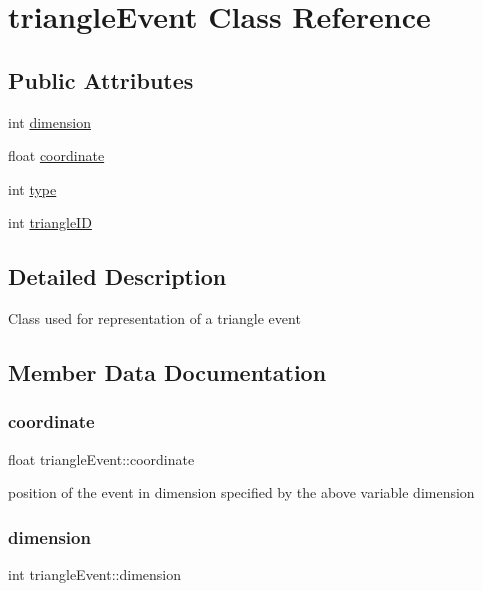 \hypertarget{classtriangle_event}{}\section{triangle\+Event Class Reference}
\label{classtriangle_event}
\subsection*{Public Attributes}
\begin{DoxyCompactItemize}
\item 
int \hyperlink{classtriangle_event_a0e413f5b305dbe0c27b8e0d38a81b7ad}{dimension}
\item 
float \hyperlink{classtriangle_event_a201ec4ed38941f5e592258e8ded88ef2}{coordinate}
\item 
int \hyperlink{classtriangle_event_a78388041677d097127500270b580826c}{type}
\item 
int \hyperlink{classtriangle_event_ae36abd7d179b513bed4caff1a85d9730}{triangle\+ID}
\end{DoxyCompactItemize}


\subsection{Detailed Description}
Class used for representation of a triangle event 

\subsection{Member Data Documentation}
\mbox{\label{classtriangle_event_a201ec4ed38941f5e592258e8ded88ef2}} 
\subsubsection{\texorpdfstring{coordinate}{coordinate}}
{\footnotesize\ttfamily float triangle\+Event\+::coordinate}

position of the event in dimension specified by the above variable dimension \mbox{\label{classtriangle_event_a0e413f5b305dbe0c27b8e0d38a81b7ad}} 
\subsubsection{\texorpdfstring{dimension}{dimension}}
{\footnotesize\ttfamily int triangle\+Event\+::dimension}

